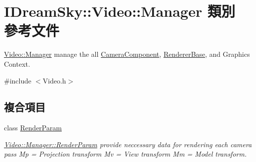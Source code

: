\hypertarget{class_i_dream_sky_1_1_video_1_1_manager}{}\section{I\+Dream\+Sky\+:\+:Video\+:\+:Manager 類別 參考文件}
\label{class_i_dream_sky_1_1_video_1_1_manager}


\hyperlink{class_i_dream_sky_1_1_video_1_1_manager}{Video\+::\+Manager} manage the all \hyperlink{class_i_dream_sky_1_1_camera_component}{Camera\+Component}, \hyperlink{class_i_dream_sky_1_1_renderer_base}{Renderer\+Base}, and Graphics Context.  




{\ttfamily \#include $<$Video.\+h$>$}

\subsection*{複合項目}
\begin{DoxyCompactItemize}
\item 
class \hyperlink{class_i_dream_sky_1_1_video_1_1_manager_1_1_render_param}{Render\+Param}
\begin{DoxyCompactList}\small\item\em \hyperlink{class_i_dream_sky_1_1_video_1_1_manager_1_1_render_param}{Video\+::\+Manager\+::\+Render\+Param} provide neccessary data for rendering each camera pass Mp = Projection transform Mv = View transform Mm = Model transform. \end{DoxyCompactList}\end{DoxyCompactItemize}
